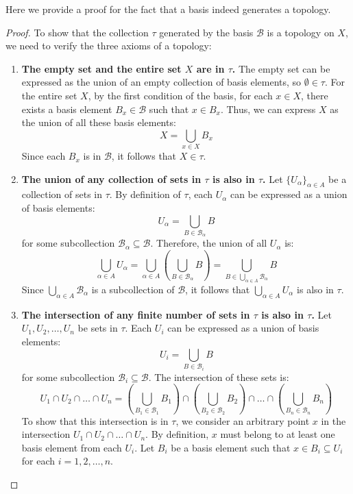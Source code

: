 Here we provide a proof for the fact that a basis indeed generates a topology.

\begin{proof}
To show that the collection $\tau$ generated by the basis $\mathcal{B}$ is a topology on $X$, we need to verify the three axioms of a topology:
\begin{enumerate}
    \item \textbf{The empty set and the entire set $X$ are in $\tau$.} 
    The empty set can be expressed as the union of an empty collection of basis elements, so $\emptyset \in \tau$. For the entire set $X$, by the first condition of the basis, for each $x \in X$, there exists a basis element $B_x \in \mathcal{B}$ such that $x \in B_x$. Thus, we can express $X$ as the union of all these basis elements:
    \[
    X = \bigcup_{x \in X} B_x
    \]
    Since each $B_x$ is in $\mathcal{B}$, it follows that $X \in \tau$.

    \item \textbf{The union of any collection of sets in $\tau$ is also in $\tau$.} 
    Let $\{U_\alpha\}_{\alpha \in A}$ be a collection of sets in $\tau$. By definition of $\tau$, each $U_\alpha$ can be expressed as a union of basis elements:
    \[
    U_\alpha = \bigcup_{B \in \mathcal{B}_\alpha} B
    \]
    for some subcollection $\mathcal{B}_\alpha \subseteq \mathcal{B}$. Therefore, the union of all $U_\alpha$ is:
    \[
    \bigcup_{\alpha \in A} U_\alpha = \bigcup_{\alpha \in A} \left( \bigcup_{B \in \mathcal{B}_\alpha} B \right) = \bigcup_{B \in \bigcup_{\alpha \in A} \mathcal{B}_\alpha} B
    \]
    Since $\bigcup_{\alpha \in A} \mathcal{B}_\alpha$ is a subcollection of $\mathcal{B}$, it follows that $\bigcup_{\alpha \in A} U_\alpha$ is also in $\tau$.

    \item \textbf{The intersection of any finite number of sets in $\tau$ is also in $\tau$.} 
    Let $U_1, U_2, \ldots, U_n$ be sets in $\tau$. Each $U_i$ can be expressed as a union of basis elements:
    \[
    U_i = \bigcup_{B \in \mathcal{B}_i} B
    \]
    for some subcollection $\mathcal{B}_i \subseteq \mathcal{B}$. The intersection of these sets is:
    \[
    U_1 \cap U_2 \cap \ldots \cap U_n = \left( \bigcup_{B_1 \in \mathcal{B}_1} B_1 \right) \cap \left( \bigcup_{B_2 \in \mathcal{B}_2} B_2 \right) \cap \ldots \cap \left( \bigcup_{B_n \in \mathcal{B}_n} B_n \right)
    \]
    To show that this intersection is in $\tau$, we consider an arbitrary point $x$ in the intersection $U_1 \cap U_2 \cap \ldots \cap U_n$. By definition, $x$ must belong to at least one basis element from each $U_i$. Let $B_i$ be a basis element such that $x \in B_i \subseteq U_i$ for each $i = 1, 2, \ldots, n$.


\end{enumerate}
\end{proof}
